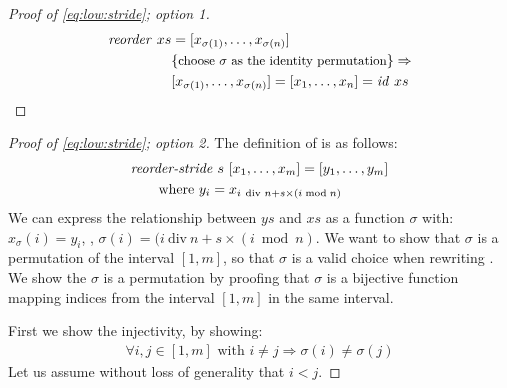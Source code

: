 \begin{proof}[Proof of \autoref{eq:low:stride}; option 1]
  \begin{align*}
    \text{\textit{reorder}}\ xs &= [x_{\sigma(1)}, \ldots, x_{\sigma(n)}]\\
                 &\{\text{\small choose $\sigma$ as the identity permutation}\} \Rightarrow\\
                 & [x_{\sigma(1)}, \ldots, x_{\sigma(n)}] = [x_1, \ldots, x_n] = \text{\textit{id}}\ xs
  \end{align*}
\end{proof}
\begin{proof}[Proof of \autoref{eq:low:stride}; option 2]
  The definition of \reorderStride is as follows:
  \begin{align*}
    &\text{\textit{reorder-stride}}\ s\ [x_1, \ldots, x_m] = [y_1, \ldots, y_m]\\
    &\qquad \text{where}\ y_i = x_{i\ \text{\normalfont div } n + s\times (i \bmod{n})}
  \end{align*}
  We can express the relationship between $ys$ and $xs$ as a function $\sigma$ with: $x_\sigma(i) = y_i$, \ie, $\sigma(i) = (i\ \text{div}\ n + s\times (i \bmod{n})$.
  We want to show that $\sigma$ is a permutation of the interval $[1, m]$, so that $\sigma$ is a valid choice when rewriting \reduce.
  We show the $\sigma$ is a permutation by proofing that $\sigma$ is a bijective function mapping indices from the interval $[1,m]$ in the same interval.

  First we show the injectivity, by showing:
  \begin{align*}
    \forall i, j \in [1, m] \text{ with } i\neq j \Rightarrow \sigma(i)\neq \sigma(j)
  \end{align*}
  Let us assume without loss of generality that $i< j$.


\end{proof}
